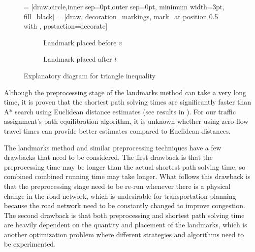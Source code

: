 \begin{figure}[H]
    \centering
     = [draw,circle,inner sep=0pt,outer sep=0pt, minimum width=3pt, fill=black]
     = [draw, decoration={markings, mark=at position 0.5 with {\arrow{>}}}, postaction={decorate}]
    \begin{subfigure}[t]{.4\textwidth}
        \centering
        \caption{Landmark placed before $v$}
    \end{subfigure}
    \hspace{1cm}
    \begin{subfigure}[t]{.4\textwidth}
        \centering
        \caption{Landmark placed after $t$}
    \end{subfigure}
    \caption{Explanatory diagram for triangle inequality}
    \label{fig:landmarks}
\end{figure}

Although the preprocessing stage of the landmarks method can take a very long time,
it is proven that the shortest path solving times are significantly faster than A* search using Euclidean distance estimates (see results in \citet{GoldbergLandmarks}).
For our traffic assignment's path equilibration algorithm,
it is unknown whether using zero-flow travel times can provide better estimates compared to Euclidean distances.

The landmarks method and similar preprocessing techniques have a few drawbacks that need to be considered.
The first drawback is that the preprocessing time may be longer than the actual shortest path solving time,
so combined combined running time may take longer.
What follows this drawback is that the preprocessing stage need to be re-run whenever there is a physical change in the road network,
which is undesirable for transportation planning because the road network need to be constantly changed to improve congestion.
The second drawback is that both preprocessing and shortest path solving time are heavily dependent on the quantity and placement of the landmarks,
which is another optimization problem where different strategies and algorithms need to be experimented.

